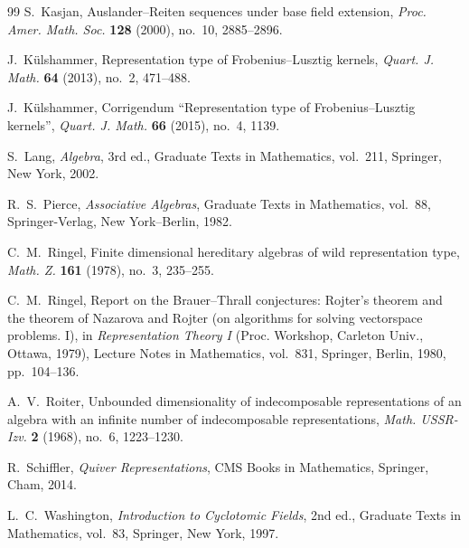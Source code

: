 \documentclass[11pt,letterpaper,reqno]{amsart}
\theoremstyle{definition}
\begin{document}
\begin{thebibliography}{99}
S.~Kasjan,
Auslander--Reiten sequences under base field extension,
\emph{Proc. Amer. Math. Soc.} \textbf{128} (2000), no.~10, 2885--2896.

J.~K\"ulshammer,
Representation type of Frobenius--Lusztig kernels,
\emph{Quart. J. Math.} \textbf{64} (2013), no.~2, 471--488.

J.~K\"ulshammer,
Corrigendum ``Representation type of Frobenius--Lusztig kernels'',
\emph{Quart. J. Math.} \textbf{66} (2015), no.~4, 1139.

S.~Lang,
\emph{Algebra}, 3rd ed.,
Graduate Texts in Mathematics, vol.~211,
Springer, New York, 2002.

R.~S.~Pierce,
\emph{Associative Algebras},
Graduate Texts in Mathematics, vol.~88,
Springer-Verlag, New York--Berlin, 1982.

C.~M.~Ringel,
Finite dimensional hereditary algebras of wild representation type,
\emph{Math. Z.} \textbf{161} (1978), no.~3, 235--255.

C.~M.~Ringel,
Report on the Brauer--Thrall conjectures: Rojter's theorem and the theorem
of Nazarova and Rojter (on algorithms for solving vectorspace problems. I),
in \emph{Representation Theory I} (Proc. Workshop, Carleton Univ., Ottawa,
1979), Lecture Notes in Mathematics, vol.~831,
Springer, Berlin, 1980, pp.~104--136.

A.~V.~Roiter,
Unbounded dimensionality of indecomposable representations of an algebra
with an infinite number of indecomposable representations,
\emph{Math. USSR-Izv.} \textbf{2} (1968), no.~6, 1223--1230.

R.~Schiffler,
\emph{Quiver Representations},
CMS Books in Mathematics,
Springer, Cham, 2014.


L.~C.~Washington,
\emph{Introduction to Cyclotomic Fields}, 2nd ed.,
Graduate Texts in Mathematics, vol.~83,
Springer, New York, 1997.


\end{thebibliography}
\end{document}
